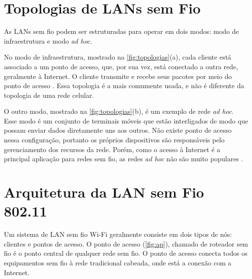 \section{Topologias de LANs sem Fio}
\label{topologias-lans-sem-fio}

As LANs sem fio podem ser estruturadas para operar em dois modos: modo de infraestrutura e modo \textit{ad hoc}.

No modo de infraestrutura, mostrado na \autoref{fig:topologias}(a), cada cliente está associado a um ponto de acesso, que, por sua vez, está conectado a outra rede, geralmente à Internet. O cliente transmite e recebe seus pacotes por meio do ponto de acesso \cite{tanenbaum2011}. Essa topologia é a mais comumente usada, e não é diferente da topologia de uma rede celular.

O outro modo, mostrado na \autoref{fig:topologias}(b), é um exemplo de rede \textit{ad hoc}. Esse modo é um conjunto de terminais móveis que estão interligados de modo que possam enviar dados diretamente uns aos outros. Não existe ponto de acesso nessa configuração, portanto os próprios dispositivos são responsáveis pelo gerenciamento dos recursos da rede. Porém, como o acesso à Internet é a principal aplicação para redes sem fio, as redes \textit{ad hoc} não são muito populares \cite{tanenbaum2011}.

\begin{figure}[H]
	\centering
\end{figure}

\section{Arquitetura da LAN sem Fio 802.11}
\label{arquitetura-802-11}

Um sistema de LAN sem fio Wi-Fi geralmente consiste em dois tipos de nós: clientes e pontos de acesso. O ponto de acesso (\autoref{fig:ap}), chamado de roteador sem fio é o ponto central de qualquer rede sem fio. O ponto de acesso conecta todos os equipamentos sem fio à rede tradicional cabeada, onde está a conexão com a Internet.

